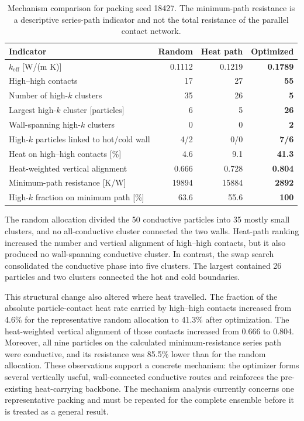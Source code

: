 \documentclass[12pt,a4paper]{article}
\begin{document}
	\begin{table}[!htbp]
		\centering
		\caption{Mechanism comparison for packing seed 18427. The minimum-path
			resistance is a descriptive series-path indicator and not the total resistance
			of the parallel contact network.}
		\label{tab:mechanism}
		\small
		\begin{tabular}{P{5.1cm}rrr}
			\toprule
			\textbf{Indicator} & \textbf{Random} & \textbf{Heat path} & \textbf{Optimized} \\
			\midrule
			$k_{\mathrm{eff}}$ [W/(m K)] & 0.1112 & 0.1219 & \textbf{0.1789} \\
			High--high contacts & 17 & 27 & \textbf{55} \\
			Number of high-$k$ clusters & 35 & 26 & \textbf{5} \\
			Largest high-$k$ cluster [particles] & 6 & 5 & \textbf{26} \\
			Wall-spanning high-$k$ clusters & 0 & 0 & \textbf{2} \\
			High-$k$ particles linked to hot/cold wall & 4/2 & 0/0 & \textbf{7/6} \\
			Heat on high--high contacts [\%] & 4.6 & 9.1 & \textbf{41.3} \\
			Heat-weighted vertical alignment & 0.666 & 0.728 & \textbf{0.804} \\
			Minimum-path resistance [K/W] & 19894 & 15884 & \textbf{2892} \\
			High-$k$ fraction on minimum path [\%] & 63.6 & 55.6 & \textbf{100} \\
			\bottomrule
		\end{tabular}
	\end{table}
	
	The random allocation divided the 50 conductive particles into 35 mostly small
	clusters, and no all-conductive cluster connected the two walls. Heat-path
	ranking increased the number and vertical alignment of high--high contacts, but
	it also produced no wall-spanning conductive cluster. In contrast, the swap
	search consolidated the conductive phase into five clusters. The largest
	contained 26 particles and two clusters connected the hot and cold boundaries.
	
	This structural change also altered where heat travelled. The fraction of the
	absolute particle-contact heat rate carried by high--high contacts increased
	from 4.6\% for the representative random allocation to 41.3\% after
	optimization. The heat-weighted vertical alignment of those contacts increased
	from 0.666 to 0.804. Moreover, all nine particles on the calculated
	minimum-resistance series path were conductive, and its resistance was 85.5\%
	lower than for the random allocation. These observations support a concrete
	mechanism: the optimizer forms several vertically useful, wall-connected
	conductive routes and reinforces the pre-existing heat-carrying backbone. The
	mechanism analysis currently concerns one representative packing and must be
	repeated for the complete ensemble before it is treated as a general result.
	
\end{document}
